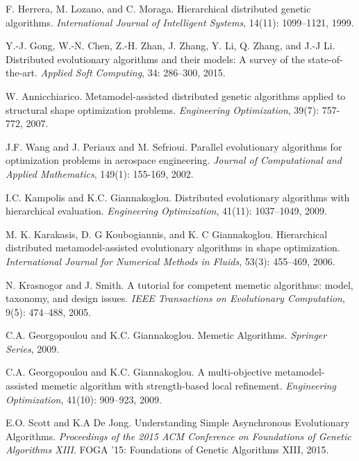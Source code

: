 
F. Herrera, M. Lozano, and C. Moraga. Hierarchical 
distributed genetic algorithms. \textit{International 
Journal of Intelligent Systems}, 14(11): 1099–1121, 1999.

Y.-J. Gong, W.-N. Chen, Z.-H. Zhan, J. Zhang, Y. Li, Q. 
Zhang, and J.-J Li. Distributed evolutionary algorithms 
and their models: A survey of the state-of-the-art. 
\textit{Applied Soft Computing}, 34: 286–300, 2015.

W. Annicchiarico. Metamodel-assisted distributed genetic 
algorithms applied to structural shape optimization 
problems. \textit{Engineering Optimization}, 39(7): 
757-772, 2007.

J.F. Wang and J. Periaux and M. Sefrioui. Parallel 
evolutionary algorithms for optimization problems in 
aerospace engineering. \textit{Journal of Computational 
and Applied Mathematics}, 149(1): 155-169, 2002.

I.C. Kampolis and K.C. Giannakoglou. Distributed 
evolutionary algorithms with hierarchical evaluation. 
\textit{Engineering Optimization}, 41(11): 1037–1049, 
2009.

M. K. Karakasis, D. G Koubogiannis, and K. C Giannakoglou. 
Hierarchical distributed metamodel-assisted evolutionary 
algorithms in shape optimization. \textit{International 
Journal for Numerical Methods in Fluids}, 53(3): 455–469, 
2006.


N. Krasnogor and J. Smith. A tutorial for competent 
memetic algorithms: model, taxonomy, and design issues. 
\textit{IEEE Transactions on Evolutionary Computation},
9(5): 474–488, 2005.

C.A. Georgopoulou and K.C. Giannakoglou.
Memetic Algorithms. \textit{Springer Series}, 2009.

C.A. Georgopoulou and K.C. Giannakoglou. A multi-objective 
metamodel-assisted memetic algorithm with strength-based 
local refinement. \textit{Engineering Optimization},
41(10): 909–923, 2009.

E.O. Scott and K.A De Jong. Understanding Simple 
Asynchronous Evolutionary Algorithms. \textit{Proceedings 
of the 2015 ACM Conference on Foundations of Genetic 
Algorithms XIII}. FOGA ’15: Foundations of Genetic 
Algorithms XIII, 2015.

